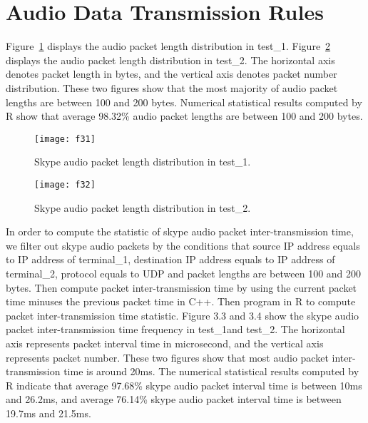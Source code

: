 \documentclass[master]{thesis}
\newcommand{\fref}[1]{Figure~\ref{#1}}   %
\begin{document}
\section{Audio Data Transmission Rules}

\fref{fig:f31} displays the audio packet length distribution in test\_1. \fref{fig:f32} displays the audio packet length distribution in test\_2. The horizontal axis denotes packet length in bytes, and the vertical axis denotes packet number distribution. These two figures show that the most majority of audio packet lengths are between 100 and 200 bytes. Numerical statistical results computed by R show that average 98.32\% audio packet lengths are between 100 and 200 bytes. 

\begin{figure}[htp]
    \texttt{[image: f31]}

    \caption[Skype audio packet length distribution in test\_1.]{Skype audio packet length distribution in test\_1.}

    \label{fig:f31}
\end{figure}

\begin{figure}[htp]
    \texttt{[image: f32]}
    \caption[Skype audio packet length distribution in test\_2.]{Skype audio packet length distribution in test\_2.}
    \label{fig:f32}
\end{figure}
In order to compute the statistic of skype audio packet inter-transmission time, we filter out skype audio packets by the conditions that source IP address equals to IP address of terminal\_1, destination IP address equals to IP address of terminal\_2, protocol equals to UDP and packet lengths are between 100 and 200 bytes. Then compute packet inter-transmission time by using the current packet time minuses the previous packet time in C++. Then program in R to compute packet inter-transmission time statistic. Figure 3.3 and 3.4 show the skype audio packet inter-transmission time frequency in test\_1and test\_2. The horizontal axis represents packet interval time in microsecond, and the vertical axis represents packet number. These two figures show that most audio packet inter-transmission time is around 20ms. The numerical statistical results computed by R indicate that average 97.68\% skype audio packet interval time is between 10ms and 26.2ms, and average 76.14\% skype audio packet interval time is between 19.7ms and 21.5ms.
\end{document}
